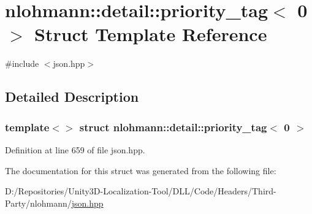 \hypertarget{structnlohmann_1_1detail_1_1priority__tag_3_010_01_4}{}\section{nlohmann\+::detail\+::priority\+\_\+tag$<$ 0 $>$ Struct Template Reference}
\label{structnlohmann_1_1detail_1_1priority__tag_3_010_01_4}


{\ttfamily \#include $<$json.\+hpp$>$}



\subsection{Detailed Description}
\subsubsection*{template$<$$>$\newline
struct nlohmann\+::detail\+::priority\+\_\+tag$<$ 0 $>$}



Definition at line 659 of file json.\+hpp.



The documentation for this struct was generated from the following file\+:\begin{DoxyCompactItemize}
\item 
D\+:/\+Repositories/\+Unity3\+D-\/\+Localization-\/\+Tool/\+D\+L\+L/\+Code/\+Headers/\+Third-\/\+Party/nlohmann/\mbox{\hyperlink{json_8hpp}{json.\+hpp}}\end{DoxyCompactItemize}
